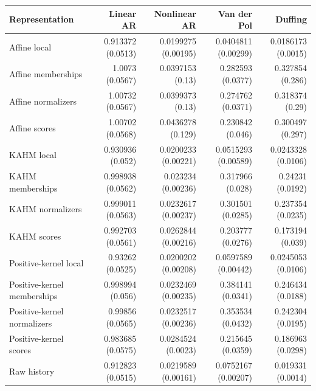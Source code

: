\begin{tabular}{lrrrr}
\toprule
Representation & Linear AR & Nonlinear AR & Van der Pol & Duffing \\
\midrule
Affine local & 0.913372 (0.0513) & 0.0199275 (0.00195) & 0.0404811 (0.00299) & 0.0186173 (0.0015) \\
Affine memberships & 1.0073 (0.0567) & 0.0397153 (0.13) & 0.282593 (0.0377) & 0.327854 (0.286) \\
Affine normalizers & 1.00732 (0.0567) & 0.0399373 (0.13) & 0.274762 (0.0371) & 0.318374 (0.29) \\
Affine scores & 1.00702 (0.0568) & 0.0436278 (0.129) & 0.230842 (0.046) & 0.300497 (0.297) \\
KAHM local & 0.930936 (0.052) & 0.0200233 (0.00221) & 0.0515293 (0.00589) & 0.0243328 (0.0106) \\
KAHM memberships & 0.998938 (0.0562) & 0.023234 (0.00236) & 0.317966 (0.028) & 0.24231 (0.0192) \\
KAHM normalizers & 0.999011 (0.0563) & 0.0232617 (0.00237) & 0.301501 (0.0285) & 0.237354 (0.0235) \\
KAHM scores & 0.992703 (0.0561) & 0.0262844 (0.00216) & 0.203777 (0.0276) & 0.173194 (0.039) \\
Positive-kernel local & 0.93262 (0.0525) & 0.0200202 (0.00208) & 0.0597589 (0.00442) & 0.0245053 (0.0106) \\
Positive-kernel memberships & 0.998994 (0.056) & 0.0232469 (0.00235) & 0.384141 (0.0341) & 0.246434 (0.0188) \\
Positive-kernel normalizers & 0.99856 (0.0565) & 0.0232517 (0.00236) & 0.353534 (0.0432) & 0.242304 (0.0195) \\
Positive-kernel scores & 0.983685 (0.0575) & 0.0284524 (0.0023) & 0.215645 (0.0359) & 0.186963 (0.0298) \\
Raw history & 0.912823 (0.0515) & 0.0219589 (0.00161) & 0.0752167 (0.00207) & 0.019331 (0.0014) \\
\bottomrule
\end{tabular}
